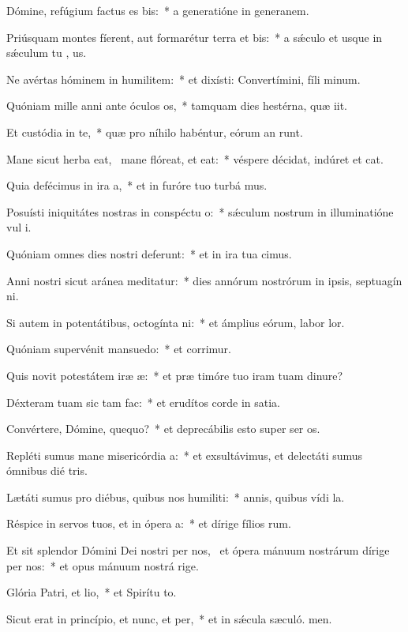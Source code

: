 \item Dómine, refúgium factus es bis:~* a generatióne in generanem.
\item Priúsquam montes fíerent, aut formarétur terra et bis:~* a sǽculo et usque in sǽculum tu , us.
\item Ne avértas hóminem in humilitem:~* et dixísti: Convertímini, fíli minum.
\item Quóniam mille anni ante óculos os,~* tamquam dies hestérna, quæ iit.
\item Et custódia in te,~* quæ pro níhilo habéntur, eórum an runt.
\item Mane sicut herba eat,~\pscross{} mane flóreat, et eat:~* véspere décidat, indúret et cat.
\item Quia defécimus in ira a,~* et in furóre tuo turbá mus.
\item Posuísti iniquitátes nostras in conspéctu o:~* sǽculum nostrum in illuminatióne vul i.
\item Quóniam omnes dies nostri deferunt:~* et in ira tua cimus.
\item Anni nostri sicut aránea meditatur:~* dies annórum nostrórum in ipsis, septuagín ni.
\item Si autem in potentátibus, octogínta ni:~* et ámplius eórum, labor  lor.
\item Quóniam supervénit mansuedo:~* et corrimur.
\item Quis novit potestátem iræ æ:~* et præ timóre tuo iram tuam dinure?
\item Déxteram tuam sic tam fac:~* et erudítos corde in satia.
\item Convértere, Dómine, quequo?~* et deprecábilis esto super ser os.
\item Repléti sumus mane misericórdia a:~* et exsultávimus, et delectáti sumus ómnibus dié tris.
\item Lætáti sumus pro diébus, quibus nos humiliti:~* annis, quibus vídi la.
\item Réspice in servos tuos, et in ópera a:~* et dírige fílios rum.
\item Et sit splendor Dómini Dei nostri per nos,~\pscross{} et ópera mánuum nostrárum dírige per nos:~* et opus mánuum nostrá rige.
\item Glória Patri, et lio,~* et Spirítu to.
\item Sicut erat in princípio, et nunc, et per,~* et in sǽcula sæculó. men.
